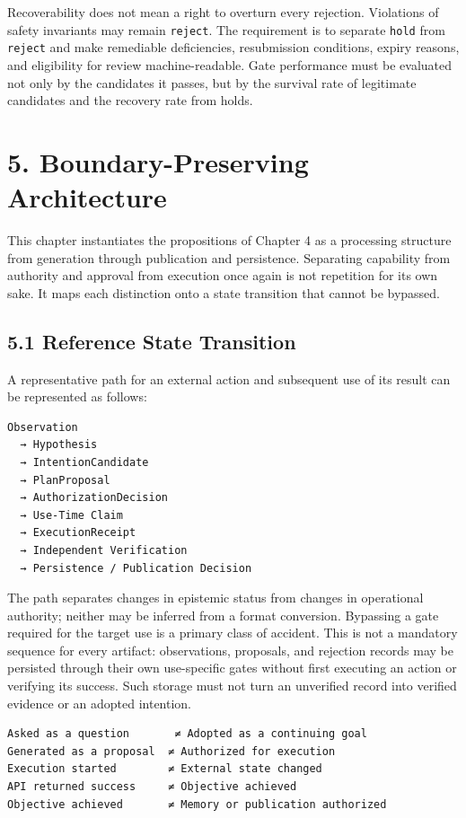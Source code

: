 Recoverability does not mean a right to overturn every rejection. Violations of safety invariants may remain \passthrough{\lstinline!reject!}. The requirement is to separate \passthrough{\lstinline!hold!} from \passthrough{\lstinline!reject!} and make remediable deficiencies, resubmission conditions, expiry reasons, and eligibility for review machine-readable. Gate performance must be evaluated not only by the candidates it passes, but by the survival rate of legitimate candidates and the recovery rate from holds.

\section{5. Boundary-Preserving Architecture}\label{boundary-preserving-architecture}

This chapter instantiates the propositions of Chapter 4 as a processing structure from generation through publication and persistence. Separating capability from authority and approval from execution once again is not repetition for its own sake. It maps each distinction onto a state transition that cannot be bypassed.

\subsection{5.1 Reference State Transition}\label{reference-state-transition}

A representative path for an external action and subsequent use of its result can be represented as follows:

\begin{lstlisting}
Observation
  → Hypothesis
  → IntentionCandidate
  → PlanProposal
  → AuthorizationDecision
  → Use-Time Claim
  → ExecutionReceipt
  → Independent Verification
  → Persistence / Publication Decision
\end{lstlisting}

The path separates changes in epistemic status from changes in operational authority; neither may be inferred from a format conversion. Bypassing a gate required for the target use is a primary class of accident. This is not a mandatory sequence for every artifact: observations, proposals, and rejection records may be persisted through their own use-specific gates without first executing an action or verifying its success. Such storage must not turn an unverified record into verified evidence or an adopted intention.

\begin{lstlisting}
Asked as a question       ≠ Adopted as a continuing goal
Generated as a proposal  ≠ Authorized for execution
Execution started        ≠ External state changed
API returned success     ≠ Objective achieved
Objective achieved       ≠ Memory or publication authorized
\end{lstlisting}

